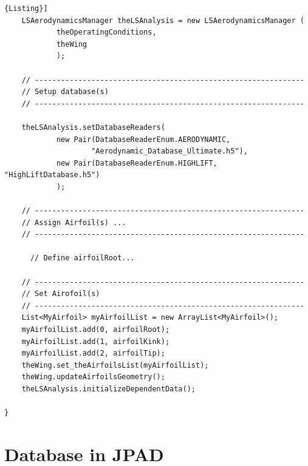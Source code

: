 \begin{lstlisting}[frame=rbl,caption={{\footnotesize Generation of an isolated Wing}},label= [style=\bfseries]{Listing}]
	LSAerodynamicsManager theLSAnalysis = new LSAerodynamicsManager ( 
			theOperatingConditions,
			theWing
			);

	// --------------------------------------------------------------
	// Setup database(s)	
	// --------------------------------------------------------------
	
	theLSAnalysis.setDatabaseReaders(
			new Pair(DatabaseReaderEnum.AERODYNAMIC, 
					"Aerodynamic_Database_Ultimate.h5"),
			new Pair(DatabaseReaderEnum.HIGHLIFT, "HighLiftDatabase.h5")
			);
	
	// --------------------------------------------------------------
	// Assign Airfoil(s) ...	
	// --------------------------------------------------------------

	  // Define airfoilRoot...
	
	// --------------------------------------------------------------
	// Set Airofoil(s)	
	// --------------------------------------------------------------
	List<MyAirfoil> myAirfoilList = new ArrayList<MyAirfoil>();
	myAirfoilList.add(0, airfoilRoot);
	myAirfoilList.add(1, airfoilKink);
	myAirfoilList.add(2, airfoilTip);
	theWing.set_theAirfoilsList(myAirfoilList);
	theWing.updateAirfoilsGeometry(); 
	theLSAnalysis.initializeDependentData();

}
\end{lstlisting}

\section {Database in JPAD}

